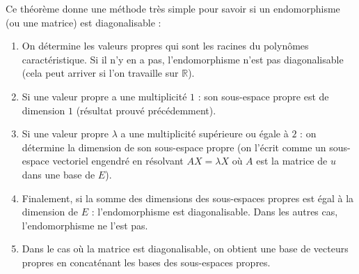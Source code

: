 \documentclass[french,11pt,twoside]{VcCours}
\begin{document}
\begin{Methode}{} Ce théorème donne une méthode très simple pour savoir si un endomorphisme (ou une matrice) est diagonalisable :

\begin{enumerate}
\item On détermine les valeurs propres qui sont les racines du polynômes caractéristique. Si il n'y en a pas, l'endomorphisme n'est pas diagonalisable (cela peut arriver si l'on travaille sur $\mathbb{R}$).
\item Si une valeur propre a une multiplicité $1$ : son sous-espace propre est de dimension $1$ (résultat prouvé précédemment).
\item Si une valeur propre $\lambda$ a une multiplicité supérieure ou égale à $2$ : on détermine la dimension de son sous-espace propre (on l'écrit comme un sous-espace vectoriel engendré en résolvant $AX= \lambda X$ où $A$ est la matrice de $u$ dans une base de $E$).
\item Finalement, si la somme des dimensions des sous-espaces propres est égal à la dimension de $E$ : l'endomorphisme est diagonalisable. Dans les autres cas, l'endomorphisme ne l'est pas. 
\item Dans le cas où la matrice est diagonalisable, on obtient une base de vecteurs propres en concaténant les bases des sous-espaces propres.
\end{enumerate}
\end{Methode}
\end{document}
